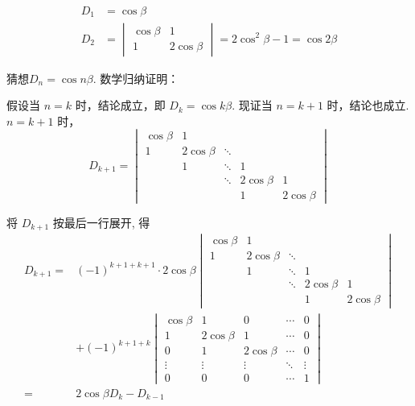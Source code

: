 \begin{solution}
    \begin{align*}
        D_1 & =\cos\beta                               \\
        D_2 & =\begin{vmatrix}
                   \cos\beta & 1          \\
                   1         & 2\cos\beta
               \end{vmatrix}=2\cos^2\beta-1=\cos2\beta
    \end{align*}

    猜想$D_n=\cos n\beta$. 数学归纳证明：

    假设当 $n=k$ 时，结论成立，即 $D_{k}=\cos k \beta$. 现证当 $n=k+1$ 时，结论也成立. $ n=k+1 $ 时，
    \[ D_{k+1} = \begin{vmatrix}
            \cos \beta & 1            &        &              &              \\
            1          & 2 \cos \beta & \ddots &              &              \\
                       & 1            & \ddots & 1            &              \\
                       &              & \ddots & 2 \cos \beta & 1            \\
                       &              &        & 1            & 2 \cos \beta
        \end{vmatrix} \]

    将 $D_{k+1}$ 按最后一行展开, 得
    \begin{align*}
        D_{k+1}={} & (-1)^{k+1+k+1} \cdot 2 \cos \beta
        \begin{vmatrix}
            \cos \beta & 1            &        &              &              \\
            1          & 2 \cos \beta & \ddots &              &              \\
                       & 1            & \ddots & 1            &              \\
                       &              & \ddots & 2 \cos \beta & 1            \\
                       &              &        & 1            & 2 \cos \beta
        \end{vmatrix} \\
                   & +(-1)^{k+1+k}
        \begin{vmatrix}
            \cos \beta & 1            & 0            & \cdots & 0      \\
            1          & 2 \cos \beta & 1            & \cdots & 0      \\
            0          & 1            & 2 \cos \beta & \cdots & 0      \\
            \vdots     & \vdots       & \vdots       & \ddots & \vdots \\
            0          & 0            & 0            & \cdots & 1
        \end{vmatrix}       \\
        ={}        & 2\cos\beta D_k-D_{k-1}
    \end{align*}


\end{solution}
